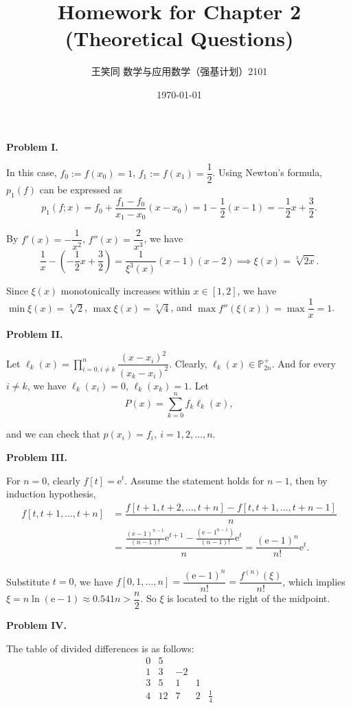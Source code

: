 \documentclass[UTF8]{ctexart}
\title{\vspace{-2cm}Homework for Chapter 2 (Theoretical Questions)}
\author{王笑同 \quad 3210105450 \quad 数学与应用数学（强基计划）2101}
\date{\today}
\begin{document}
\pagestyle{plain}

\maketitle

\textbf{Problem I.}

In this case, $f_0:=f(x_0)=1$, $f_1:=f(x_1)=\dfrac12$. Using Newton's formula, $p_1(f)$ can be expressed as
\[p_1(f;x)=f_0+\dfrac{f_1-f_0}{x_1-x_0}(x-x_0)=1-\dfrac12(x-1)=-\dfrac12x+\dfrac32.\]

By $f'(x)=-\dfrac{1}{x^2}$, $f''(x)=\dfrac{2}{x^3}$, we have
\[\dfrac1x-\left(-\dfrac12x+\dfrac32\right)=\dfrac{1}{\xi^3(x)}(x-1)(x-2)\implies \xi(x)=\sqrt[3]{2x}.\]

Since $\xi(x)$ monotonically increases within $x\in[1,2]$, we have $\min \xi(x)=\sqrt[3]2$, $\max\xi(x)=\sqrt[3]{4}$, and $\max f''(\xi(x))=\max \dfrac1x=1$.

\quad

\textbf{Problem II. }

Let $\ell_k(x)=\displaystyle\prod\limits_{i=0,i\neq k}^n\dfrac{(x-x_i)^2}{(x_k-x_i)^2}$. Clearly, $\ell_k(x)\in\mathbb{P}_{2n}^+$. And for every $i\neq k$, we have $\ell_k(x_i)=0$, $\ell_k(x_k)=1$. Let
\[P(x)=\sum_{k=0}^n f_k\ell_k(x),\]

and we can check that $p(x_i)=f_i,\ i=1,2,\dots,n$.

\quad

\textbf{Problem III. }

For $n=0$, clearly $f[t]=\mathrm{e}^t$. Assume the statement holds for $n-1$, then by induction hypothesis,
\[\begin{aligned}
    f[t,t+1,\dots,t+n]&=\dfrac{f[t+1,t+2,\dots,t+n]-f[t,t+1,\dots,t+n-1]}{n}
    \\&=\dfrac{\frac{(\mathrm{e}-1)^{n-1}}{(n-1)!}\mathrm{e}^{t+1}-\frac{(\mathrm{e-1}^{n-1})}{(n-1)!}\mathrm{e}^{t}}{n}=\dfrac{(\mathrm{e}-1)^n}{n!}\mathrm{e}^t.
\end{aligned}\]

Substitute $t=0$, we have $f[0,1,\dots,n]=\dfrac{(\mathrm{e}-1)^n}{n!}=\dfrac{f^{(n)}(\xi)}{n!}$, which implies $\xi=n\ln(\mathrm{e}-1)\approx 0.541n>\dfrac n2$. So $\xi$ is located to the right of the midpoint.

\newpage

\textbf{Problem IV. }

The table of divided differences is as follows:
\[\begin{array}{c|cccc}
    0 & 5 &  &  &  \\
    1 & 3 & -2 &  &  \\
    3 & 5 & 1 & 1 &  \\
    4 & 12 & 7 & 2 & \frac14
\end{array}\]
\end{document}
